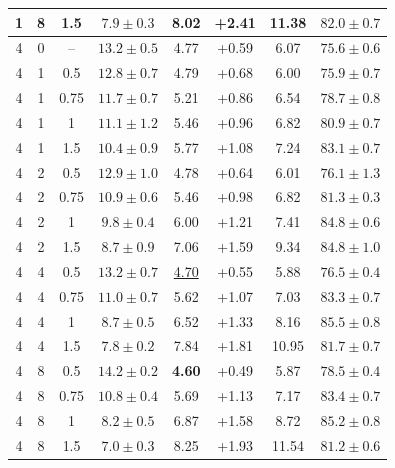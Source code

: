 \documentclass{article}
\begin{document}
\begin{table}[!htbp]
\begin{tabular}{cccccccc}
1 & 8 & 1.5 & $7.9\pm0.3$ & 8.02 & +2.41 & 11.38 & $82.0\pm0.7$\\
\midrule
4 & 0 & -- & $13.2\pm0.5$ & 4.77 & +0.59 & 6.07 & $75.6\pm0.6$\\
4 & 1 & 0.5 & $12.8\pm0.7$ & 4.79 & +0.68 & 6.00 & $75.9\pm0.7$\\
4 & 1 & 0.75 & $11.7\pm0.7$ & 5.21 & +0.86 & 6.54 & $78.7\pm0.8$\\
4 & 1 & 1 & $11.1\pm1.2$ & 5.46 & +0.96 & 6.82 & $80.9\pm0.7$\\
4 & 1 & 1.5 & $10.4\pm0.9$ & 5.77 & +1.08 & 7.24 & $83.1\pm0.7$\\
4 & 2 & 0.5 & $12.9\pm1.0$ & 4.78 & +0.64 & 6.01 & $76.1\pm1.3$\\
4 & 2 & 0.75 & $10.9\pm0.6$ & 5.46 & +0.98 & 6.82 & $81.3\pm0.3$\\
4 & 2 & 1 & $9.8\pm0.4$ & 6.00 & +1.21 & 7.41 & $84.8\pm0.6$\\
4 & 2 & 1.5 & $8.7\pm0.9$ & 7.06 & +1.59 & 9.34 & $84.8\pm1.0$\\
4 & 4 & 0.5 & $13.2\pm0.7$ & \underline{4.70}& +0.55 & 5.88 & $76.5\pm0.4$\\
4 & 4 & 0.75 & $11.0\pm0.7$ & 5.62 & +1.07 & 7.03 & $83.3\pm0.7$\\
4 & 4 & 1 & $8.7\pm0.5$ & 6.52 & +1.33 & 8.16 & $85.5\pm0.8$\\
4 & 4 & 1.5 & $7.8\pm0.2$ & 7.84 & +1.81 & 10.95 & $81.7\pm0.7$\\
4 & 8 & 0.5 & $\mathbf{14.2\pm0.2}$& \textbf{4.60}& +0.49 & 5.87 & $78.5\pm0.4$\\
4 & 8 & 0.75 & $10.8\pm0.4$ & 5.69 & +1.13 & 7.17 & $83.4\pm0.7$\\
4 & 8 & 1 & $8.2\pm0.5$ & 6.87 & +1.58 & 8.72 & $85.2\pm0.8$\\
4 & 8 & 1.5 & $7.0\pm0.3$ & 8.25 & +1.93 & 11.54 & $81.2\pm0.6$\\
\bottomrule
\end{tabular}
\end{table}
\clearpage
\end{document}
